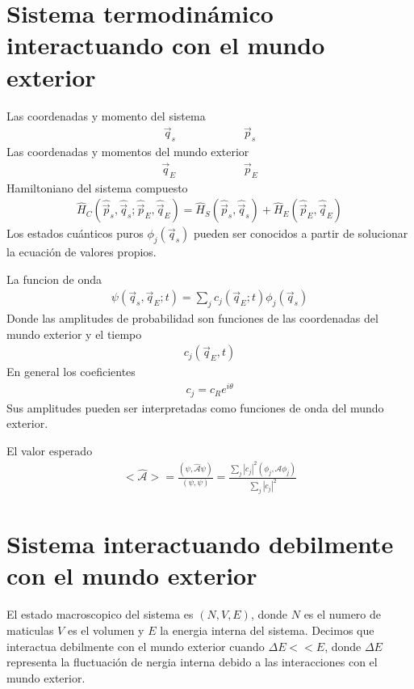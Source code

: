 \documentclass{article}
\begin{document}
\section{Sistema termodinámico interactuando con el mundo exterior }
Las coordenadas y momento del sistema 
\begin{gather*}
  \vec q_s \qquad \qquad \qquad \vec p_s  
\end{gather*}
Las coordenadas y momentos del mundo exterior 
\begin{gather*}
  \vec q_E \qquad \qquad \qquad \vec p_E  
\end{gather*}
Hamiltoniano del sistema compuesto 
\begin{gather*}
  \hat H_C (\hat{\vec p}_s, \hat{\vec q}_s;\hat{\vec p}_E,\hat{\vec q}_E) = \hat H_S(\hat{\vec p}_s,\hat{\vec q}_s) +  \hat H_E(\hat{\vec p}_E,\hat{\vec q}_E)
\end{gather*}
Los estados cuánticos puros $ \phi_j (\vec q_s ) $ pueden ser conocidos a partir de solucionar la ecuación de valores propios.

La funcion de onda 
\begin{gather*}
  \psi (\vec q_s, \vec q_E; t ) = \displaystyle\sum_{j }^{} c_j (\vec q_E;t ) \phi_j (\vec q_s )
\end{gather*}
Donde las amplitudes de probabilidad son funciones de las coordenadas del mundo exterior y el tiempo 
\begin{gather*}
  c_j (\vec q_E, t ) 
\end{gather*}
En general los coeficientes 
\begin{gather*}
  c_j = c_R e ^ {i\theta }
\end{gather*}
Sus amplitudes pueden ser interpretadas como funciones de onda del mundo exterior.

El valor esperado 
\begin{gather*}
  <\hat{\mathcal A } > = \frac{(\psi,\hat{\mathcal A }\psi )}{(\psi,\psi)} = \frac{\displaystyle\sum_{j }^{} \left|c_j \right|^2 (\phi_j, \hat{\mathcal A }\phi_j )}{\displaystyle\sum_{j }^{} \left|c_j \right|^2}
\end{gather*}

\section{Sistema interactuando debilmente con el mundo exterior }
El estado macroscopico del sistema es $ (N,V,E ) $, donde $ N  $ es el numero de maticulas $ V  $ es el volumen y $ E  $ la energia interna del sistema. Decimos que interactua debilmente con el mundo exterior cuando $ \Delta E << E  $, donde $ \Delta E  $ representa la fluctuación de nergia interna debido a las interacciones con el mundo exterior.
\end{document}
